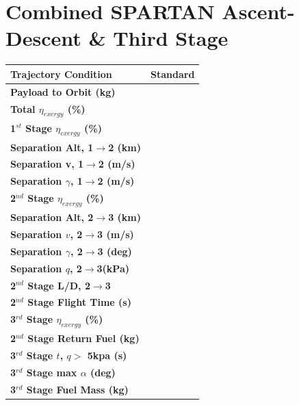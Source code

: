 \section{Combined SPARTAN Ascent-Descent \& Third Stage}
\begin{table}[ht]
	\centering
\begin{tabular}{l c } 
	\hline \textbf{Trajectory Condition}
	&Standard

	\\
	\hline \textbf{Payload to Orbit (kg)}
	& \textbf{\PayloadToOrbitStandard}
	\\
	\textbf{Total $\eta_{exergy}$ (\%)}
	& \textbf{\totalExergyEffStandard}
	\\
	\hline 
	\textbf{1$^{st}$ Stage $\eta_{exergy}$ (\%)}
	& \textbf{\firstExergyEffStandard}
	\\
	\textbf{Separation Alt, 1$\rightarrow$2 (km)}
	& \firstsecondSeparationAltStandard
	\\
	\textbf{Separation v, 1$\rightarrow$2 (m/s)}
	& \firstsecondSeparationvStandard
	\\
	\textbf{Separation $\gamma$, 1$\rightarrow$2 (m/s)}
	& \firstsecondSeparationgammaStandard
	\\
	\hline 
	\textbf{2$^{nd}$ Stage $\eta_{exergy}$ (\%)}
	& \textbf{\secondExergyEffStandard}
	\\
	\textbf{Separation Alt, 2$\rightarrow$3 (km)}
	& \secondthirdSeparationAltStandard
	\\
	\textbf{Separation $v$, 2$\rightarrow$3 (m/s)}
	& \secondthirdSeparationvStandard
	\\
	\textbf{Separation $\gamma$, 2$\rightarrow$3 (deg)}
	& \secondthirdSeparationgammaStandard
	\\
	\textbf{Separation $q$, 2$\rightarrow$3(kPa)}
	& \secondthirdSeparationqStandard
	\\
	\textbf{2$^{nd}$ Stage L/D, 2$\rightarrow$3}
	& \secondthirdSeparationLDStandard
	\\
	\textbf{2$^{nd}$ Stage Flight Time (s)}
	& \secondFlightTimeStandard
	\\
	\hline 
	\textbf{3$^{rd}$ Stage $\eta_{exergy}$ (\%)}
	& \textbf{\thirddExergyEffStandard}
	\\
	\textbf{2$^{nd}$ Stage Return Fuel (kg)}
	& \returnFuelStandard
	\\
	\textbf{3$^{rd}$ Stage $t$, $q >$ 5kpa (s)}
	& \thirdqOverFiveStandard
	\\
	\textbf{3$^{rd}$ Stage max $\alpha$ (deg)}
	& \thirdmaxAoAStandard
	\\
	\textbf{3$^{rd}$ Stage Fuel Mass (kg)}
	& \thirdmFuelStandard
	\\
	\hline 
\end{tabular} 
\end{table}

